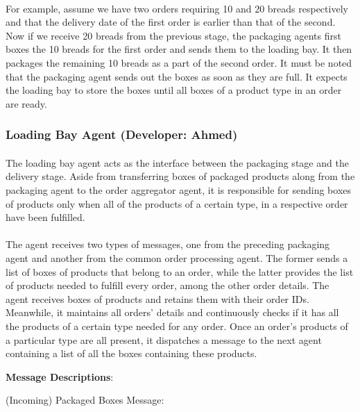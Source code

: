 \documentclass[11pt, a4paper]{article}
\begin{document}
\paragraph{}
For example, assume we have two orders requiring 10 and 20 breads respectively and that the delivery date of the first order is earlier than that of the second. Now if we receive 20 breads from the previous stage, the packaging agents first boxes the 10 breads for the first order and sends them to the loading bay. It then packages the remaining 10 breads as a part of the second order. It must be noted that the packaging agent sends out the boxes as soon as they are full. It expects the loading bay to store the boxes until all boxes of a product type in an order are ready.

\subsubsection{Loading Bay Agent (Developer: Ahmed)}
\paragraph{}
The loading bay agent acts as the interface between the packaging stage and the delivery stage. Aside from transferring boxes of packaged products along from the packaging agent to the order aggregator agent, it is responsible for sending boxes of products only when all of the products of a certain type, in a respective order have been fulfilled.
\paragraph{}
The agent receives two types of messages, one from the preceding packaging agent and another from the common order processing agent. The former sends a list of boxes of products that belong to an order, while the latter provides the list of products needed to fulfill every order, among the other order details. The agent receives boxes of products and retains them with their order IDs. Meanwhile, it maintains all orders' details and continuously checks if it has all the products of a certain type needed for any order. Once an order's products of a particular type are all present, it dispatches a message to the next agent containing a list of all the boxes containing these products.
	
\pagebreak
\hfill\break
\textbf{Message Descriptions}:

\hfill\break
(Incoming) Packaged Boxes Message:
\end{document}
